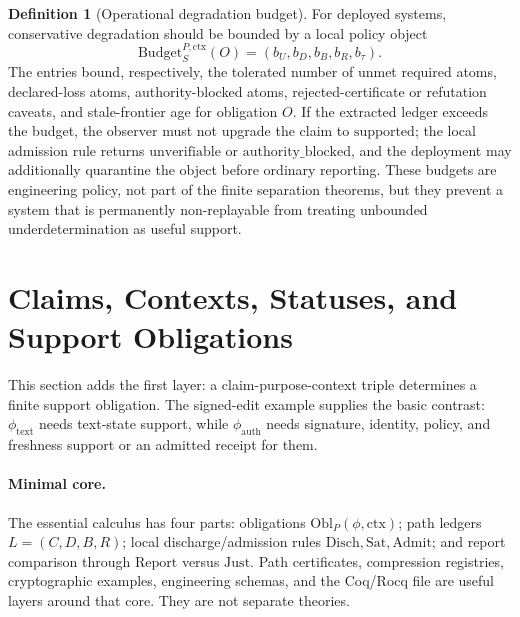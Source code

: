 \documentclass[11pt,twoside]{article}
\theoremstyle{definition}
\newtheorem{definition}[theorem]{Definition}
\newcommand{\Obl}{\mathrm{Obl}}
\newcommand{\Sat}{\mathrm{Sat}}
\newcommand{\Admit}{\mathrm{Admit}}
\newcommand{\Disch}{\mathrm{Disch}}
\newcommand{\Just}{\mathrm{Just}}
\newcommand{\Report}{\mathrm{Report}}
\newcommand{\ctx}{\mathrm{ctx}}
\newcommand{\supported}{\mathrm{supported}}
\newcommand{\authorityblocked}{\mathrm{authority\_blocked}}
\newcommand{\unverifiable}{\mathrm{unverifiable}}
\begin{document}
\begin{definition}[Operational degradation budget]
\label{def:degradation-budget}
For deployed systems, conservative degradation should be bounded by a local
policy object
\[
  \mathrm{Budget}_S^{P,\ctx}(O)=(b_U,b_D,b_B,b_R,b_\tau).
\]
The entries bound, respectively, the tolerated number of unmet required atoms,
declared-loss atoms, authority-blocked atoms, rejected-certificate or refutation
caveats, and stale-frontier age for obligation $O$. If the extracted ledger
exceeds the budget, the observer must not upgrade the claim to $\supported$; the
local admission rule returns $\unverifiable$ or $\authorityblocked$, and the
deployment may additionally quarantine the object before ordinary reporting.
These budgets are engineering policy, not part of the finite separation
theorems, but they prevent a system that is permanently non-replayable from
treating unbounded underdetermination as useful support.
\end{definition}
\FloatBarrier

\section{Claims, Contexts, Statuses, and Support Obligations}
\label{sec:claims-obligations}

This section adds the first layer: a claim-purpose-context triple determines a
finite support obligation. The signed-edit example supplies the basic contrast:
$\phi_{\mathrm{text}}$ needs text-state support, while
$\phi_{\mathrm{auth}}$ needs signature, identity, policy, and freshness support
or an admitted receipt for them.

\paragraph{Minimal core.}
\label{sec:minimal-core}

The essential calculus has four parts: obligations
$\Obl_P(\phi,\ctx)$; path ledgers $L=(C,D,B,R)$; local discharge/admission
rules $\Disch,\Sat,\Admit$; and report comparison through $\Report$ versus
$\Just$. Path certificates, compression registries, cryptographic examples,
engineering schemas, and the Coq/Rocq file are useful layers around that core.
They are not separate theories.
\end{document}
